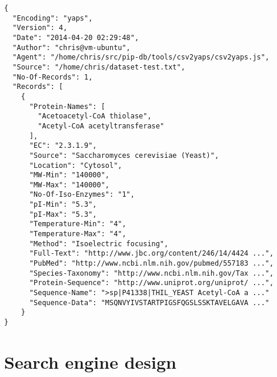 \lstset{language=JavaScript}
\begin{lstlisting}[label=lst:yaps-example,caption={
      [Example YAPS encoded dataset]
      An example YAPS encoded dataset, containing a single record.}]
{
  "Encoding": "yaps",
  "Version": 4,
  "Date": "2014-04-20 02:29:48",
  "Author": "chris@vm-ubuntu",
  "Agent": "/home/chris/src/pip-db/tools/csv2yaps/csv2yaps.js",
  "Source": "/home/chris/dataset-test.txt",
  "No-Of-Records": 1,
  "Records": [
    {
      "Protein-Names": [
        "Acetoacetyl-CoA thiolase",
        "Acetyl-CoA acetyltransferase"
      ],
      "EC": "2.3.1.9",
      "Source": "Saccharomyces cerevisiae (Yeast)",
      "Location": "Cytosol",
      "MW-Min": "140000",
      "MW-Max": "140000",
      "No-Of-Iso-Enzymes": "1",
      "pI-Min": "5.3",
      "pI-Max": "5.3",
      "Temperature-Min": "4",
      "Temperature-Max": "4",
      "Method": "Isoelectric focusing",
      "Full-Text": "http://www.jbc.org/content/246/14/4424 ...",
      "PubMed": "http://www.ncbi.nlm.nih.gov/pubmed/557183 ...",
      "Species-Taxonomy": "http://www.ncbi.nlm.nih.gov/Tax ...",
      "Protein-Sequence": "http://www.uniprot.org/uniprot/ ...",
      "Sequence-Name": ">sp|P41338|THIL_YEAST Acetyl-CoA a ..."
      "Sequence-Data": "MSQNVYIVSTARTPIGSFQGSLSSKTAVELGAVA ..."
    }
}
\end{lstlisting}

\section{Search engine design}

